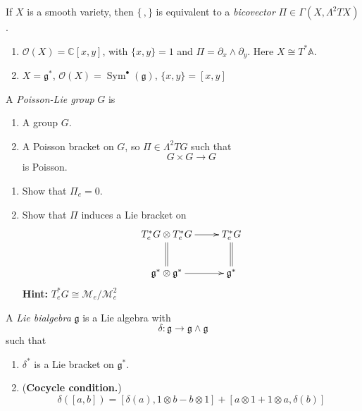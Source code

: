 \begin{remark}
\label{remark-l2-bivector}
If $X$ is a smooth variety, then
$\{\,,\}$ is equivalent to a
{\it bicovector}
$\Pi\in \Gamma(X,\Lambda^{2} TX)$.
\end{remark}

\begin{example}
\label{example-l2-poisson}
\begin{enumerate}
\item $\mathcal{O}(X)=\mathbb{C}[x,y]$,
with $\{x,y\} =1$ and
$\Pi=\partial_{x}\wedge\partial_{y}$.
Here $X\cong T^{*} \mathbb{A}$.
\item $X=\mathfrak{g}^{*}$,
$\mathcal{O}(X)=
\operatorname{Sym}^{\bullet}(\mathfrak{g})$,
$\{x,y\}=[x,y]$
\end{enumerate}
\end{example}

\begin{definition}
\label{definition-l2-poisson-lie-group}
A {\it Poisson-Lie group} $G$ is
\begin{enumerate}
\item A group $G$.
\item A Poisson bracket on $G$, so
$\Pi\in \Lambda^{2}TG$ such that
$$
G\times G\to G
$$
is Poisson.
\end{enumerate}
\end{definition}

\begin{exercise}
\label{exercise-l2-poisson-lie}
\begin{enumerate}
\item Show that $\Pi_{e}=0$.
\item Show that $\Pi$ induces a Lie
bracket on
$$
\xymatrix{
T^{*}_{e}G\otimes T^{*}_{e}G
\ar[r] \ar@{=}[d]
& T^{*}_{e}G \ar@{=}[d]\\
\mathfrak{g}^{*} \otimes \mathfrak{g}^{*}
\ar[r] & \mathfrak{g}^{*}
}
$$
{\bf Hint:}
$T^{*}_{e}G\cong
\mathcal{M}_{e}/\mathcal{M}^{2}_{e}$
\end{enumerate}
\end{exercise}

\begin{definition}
\label{definition-l2-lie-bialgebra}
A {\it Lie bialgebra} $\mathfrak{g}$ is a
Lie algebra with
$$
\delta:\mathfrak{g}\to
\mathfrak{g}\wedge \mathfrak{g}
$$
such that
\begin{enumerate}
\item $\delta^{*}$ is a Lie bracket on
$\mathfrak{g}^{*}$.
\item ({\bf Cocycle condition.})
$$
\delta([a,b])=[\delta(a),1\otimes b-
b\otimes 1]+[a\otimes 1+1\otimes a,
\delta(b)]
$$
\end{enumerate}
\end{definition}

